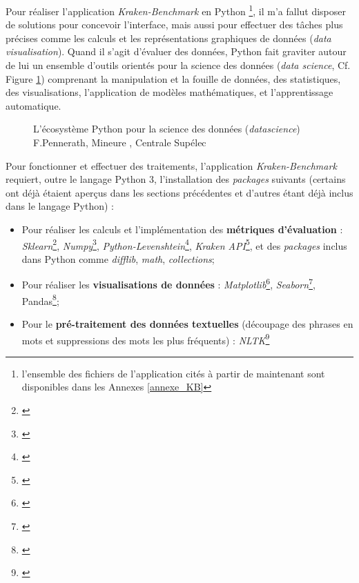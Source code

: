 Pour réaliser l'application \textit{Kraken-Benchmark} en Python \footnote{l'ensemble des fichiers de l'application cités à partir de maintenant sont disponibles dans les Annexes \ref{annexe_KB}}, il m'a fallut disposer de solutions pour concevoir l'interface, mais aussi pour effectuer des tâches plus précises comme les calculs et les représentations graphiques de données (\textit{data visualisation}). Quand il s'agit d'évaluer des données, Python fait graviter autour de lui un ensemble d'outils orientés pour la science des données (\textit{data science}, Cf. Figure \ref{fig:eco_datascience}) comprenant la manipulation et la fouille de données, des statistiques, des visualisations, l'application de modèles mathématiques, et l'apprentissage automatique. 

\begin{figure}[h!]
    \centering
    \centerline{}
    \caption{L'écosystème Python pour la science des données (\textit{datascience})   \textcopyright F.Pennerath, Mineure , Centrale Supélec}
    \label{fig:eco_datascience}
\end{figure}

Pour fonctionner et effectuer des traitements, l'application \textit{Kraken-Benchmark} requiert, outre le langage Python 3, l'installation des \textit{packages} suivants (certains ont déjà étaient aperçus dans les sections précédentes et d'autres étant déjà inclus dans le langage Python) : 
\newpage
\begin{itemize}
    \item Pour réaliser les calculs et l'implémentation des \textbf{métriques d'évaluation} : \textit{Sklearn}\footnote{\cite{noauthor_scikit-learn_nodate}}, \textit{Numpy}\footnote{\cite{noauthor_numpy_nodate}}, \textit{Python-Levenshtein}\footnote{\cite{noauthor_python-levenshtein_nodate}}, \textit{Kraken API}\footnote{\cite{noauthor_kraken_nodate}}, et des \textit{packages} inclus dans Python comme \textit{difflib}, \textit{math}, \textit{collections};
    \item Pour réaliser les \textbf{visualisations de données} : \textit{Matplotlib}\footnote{\cite{noauthor_matplotlib_nodate}}, \textit{Seaborn}\footnote{\cite{noauthor_seaborn_nodate}}, Pandas\footnote{\cite{noauthor_pandas_nodate}};
    \item Pour le \textbf{pré-traitement des données textuelles} (découpage des phrases en mots et suppressions des mots les plus fréquents) : \textit{NLTK}\footnote{\cite{noauthor_nltk_nodate}}
\end{itemize}

